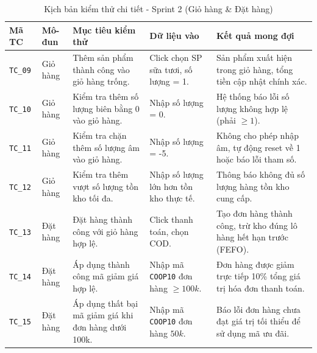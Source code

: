 \begin{table}[H]
\centering
\caption{Kịch bản kiểm thử chi tiết - Sprint 2 (Giỏ hàng \& Đặt hàng)}
\renewcommand{\arraystretch}{1.2}
\small
\begin{tabular}{|p{1.2cm}|p{1.8cm}|p{3.5cm}|p{2.5cm}|p{5.5cm}|}
\hline
\textbf{Mã TC} & \textbf{Mô-đun} & \textbf{Mục tiêu kiểm thử} & \textbf{Dữ liệu vào} & \textbf{Kết quả mong đợi} \\ \hline
\texttt{TC\_09} & Giỏ hàng & Thêm sản phẩm thành công vào giỏ hàng trống. & Click chọn SP sữa tươi, số lượng = 1. & Sản phẩm xuất hiện trong giỏ hàng, tổng tiền cập nhật chính xác. \\ \hline
\texttt{TC\_10} & Giỏ hàng & Kiểm tra thêm số lượng biên bằng $0$ vào giỏ hàng. & Nhập số lượng = 0. & Hệ thống báo lỗi số lượng không hợp lệ (phải $\ge 1$). \\ \hline
\texttt{TC\_11} & Giỏ hàng & Kiểm tra chặn thêm số lượng âm vào giỏ hàng. & Nhập số lượng = -5. & Không cho phép nhập âm, tự động reset về 1 hoặc báo lỗi tham số. \\ \hline
\texttt{TC\_12} & Giỏ hàng & Kiểm tra thêm vượt số lượng tồn kho tối đa. & Nhập số lượng lớn hơn tồn kho thực tế. & Thông báo không đủ số lượng hàng tồn kho cung cấp. \\ \hline
\texttt{TC\_13} & Đặt hàng & Đặt hàng thành công với giỏ hàng hợp lệ. & Click thanh toán, chọn COD. & Tạo đơn hàng thành công, trừ kho đúng lô hàng hết hạn trước (FEFO). \\ \hline
\texttt{TC\_14} & Đặt hàng & Áp dụng thành công mã giảm giá hợp lệ. & Nhập mã \texttt{COOP10} đơn hàng $\ge 100k$. & Đơn hàng được giảm trực tiếp 10\% tổng giá trị hóa đơn thanh toán. \\ \hline
\texttt{TC\_15} & Đặt hàng & Áp dụng thất bại mã giảm giá khi đơn hàng dưới 100k. & Nhập mã \texttt{COOP10} đơn hàng $50k$. & Báo lỗi đơn hàng chưa đạt giá trị tối thiểu để sử dụng mã ưu đãi. \\ \hline
\end{tabular}
\end{table}